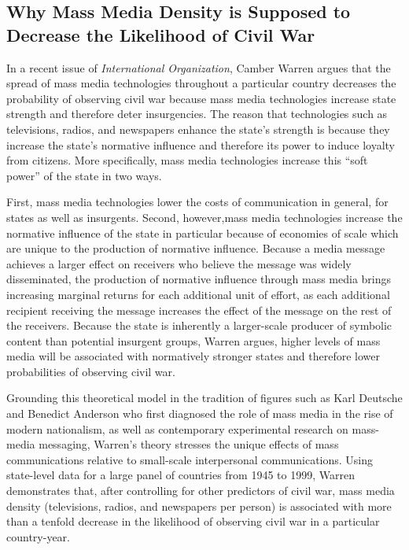 \documentclass[11pt,article,oneside]{memoir}
\begin{document}
\subsection{Why Mass Media Density is Supposed to Decrease the
Likelihood of Civil
War}\label{why-mass-media-density-is-supposed-to-decrease-the-likelihood-of-civil-war}

In a recent issue of \emph{International Organization}, Camber Warren
argues that the spread of mass media technologies throughout a
particular country decreases the probability of observing civil war
because mass media technologies increase state strength and therefore
deter insurgencies. The reason that technologies such as televisions,
radios, and newspapers enhance the state's strength is because they
increase the state's normative influence and therefore its power to
induce loyalty from citizens. More specifically, mass media technologies
increase this ``soft power'' of the state in two ways.

First, mass media technologies lower the costs of communication in
general, for states as well as insurgents. Second, however,mass media
technologies increase the normative influence of the state in particular
because of economies of scale which are unique to the production of
normative influence. Because a media message achieves a larger effect on
receivers who believe the message was widely disseminated, the
production of normative influence through mass media brings increasing
marginal returns for each additional unit of effort, as each additional
recipient receiving the message increases the effect of the message on
the rest of the receivers. Because the state is inherently a
larger-scale producer of symbolic content than potential insurgent
groups, Warren argues, higher levels of mass media will be associated
with normatively stronger states and therefore lower probabilities of
observing civil war.

Grounding this theoretical model in the tradition of figures such as
Karl Deutsche and Benedict Anderson who first diagnosed the role of mass
media in the rise of modern nationalism, as well as contemporary
experimental research on mass-media messaging, Warren's theory stresses
the unique effects of mass communications relative to small-scale
interpersonal communications. Using state-level data for a large panel
of countries from 1945 to 1999, Warren demonstrates that, after
controlling for other predictors of civil war, mass media density
(televisions, radios, and newspapers per person) is associated with more
than a tenfold decrease in the likelihood of observing civil war in a
particular country-year.
\end{document}
